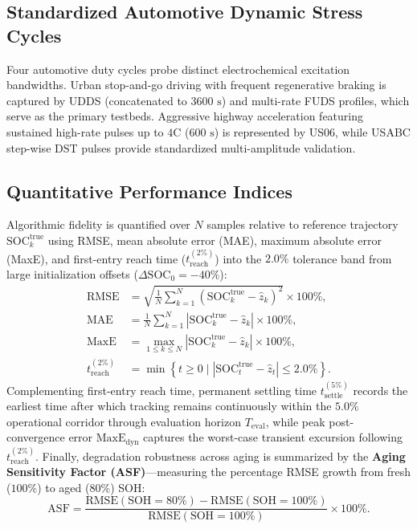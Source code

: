 \documentclass[11pt,a4paper]{article}
\begin{document}
\subsection{Standardized Automotive Dynamic Stress Cycles}
Four automotive duty cycles probe distinct electrochemical excitation bandwidths. Urban stop-and-go driving with frequent regenerative braking is captured by UDDS (concatenated to $3600\text{ s}$) and multi-rate FUDS profiles, which serve as the primary testbeds. Aggressive highway acceleration featuring sustained high-rate pulses up to $4\text{C}$ ($600\text{ s}$) is represented by US06, while USABC step-wise DST pulses provide standardized multi-amplitude validation.

\subsection{Quantitative Performance Indices}
Algorithmic fidelity is quantified over $N$ samples relative to reference trajectory $\text{SOC}_k^{\text{true}}$ using RMSE, mean absolute error (MAE), maximum absolute error (MaxE), and first-entry reach time ($t_{\text{reach}}^{(2\%)}$) into the $2.0\%$ tolerance band from large initialization offsets ($\Delta\text{SOC}_0 = -40\%$):
\begin{align}
\text{RMSE} &= \sqrt{\tfrac{1}{N}\textstyle\sum_{k=1}^N (\text{SOC}_k^{\text{true}} - \hat{z}_k)^2} \times 100\%, \label{eqn:rmse}\\
\text{MAE} &= \tfrac{1}{N}\textstyle\sum_{k=1}^N |\text{SOC}_k^{\text{true}} - \hat{z}_k| \times 100\%, \label{eqn:mae}\\
\text{MaxE} &= \max_{1 \le k \le N} |\text{SOC}_k^{\text{true}} - \hat{z}_k| \times 100\%, \label{eqn:maxe}\\
t_{\text{reach}}^{(2\%)} &= \min\left\{ t \ge 0 \mid |\text{SOC}_t^{\text{true}} - \hat{z}_t| \le 2.0\% \right\}. \label{eqn:treach}
\end{align}
Complementing first-entry reach time, permanent settling time $t_{\text{settle}}^{(5\%)}$ records the earliest time after which tracking remains continuously within the $5.0\%$ operational corridor through evaluation horizon $T_{\text{eval}}$, while peak post-convergence error $\text{MaxE}_{\text{dyn}}$ captures the worst-case transient excursion following $t_{\text{reach}}^{(2\%)}$. Finally, degradation robustness across aging is summarized by the \textbf{Aging Sensitivity Factor (ASF)}---measuring the percentage RMSE growth from fresh ($100\%$) to aged ($80\%$) SOH:
\begin{equation}\label{eqn:asf}
\text{ASF} = \frac{\text{RMSE}(\text{SOH}=80\%) - \text{RMSE}(\text{SOH}=100\%)}{\text{RMSE}(\text{SOH}=100\%)} \times 100\%.
\end{equation}
\end{document}
